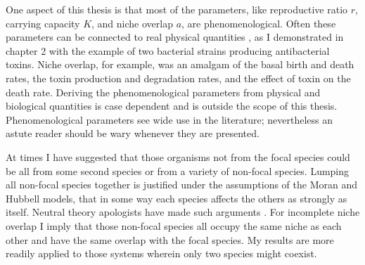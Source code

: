 One aspect of this thesis is that most of the parameters, like reproductive ratio $r$, carrying capacity $K$, and niche overlap $a$, are phenomenological. 
Often these parameters can be connected to real physical quantities \cite{Caperon1967,MacArthur1967}, as I demonstrated in chapter 2 with the example of two bacterial strains producing antibacterial toxins. 
Niche overlap, for example, was an amalgam of the basal birth and death rates, the toxin production and degradation rates, and the effect of toxin on the death rate. 
Deriving the phenomenological parameters from physical and biological quantities is case dependent and is outside the scope of this thesis. 
Phenomenological parameters see wide use in the literature; nevertheless an astute reader should be wary whenever they are presented. 

At times I have suggested that those organisms not from the focal species could be all from some second species or from a variety of non-focal species. 
Lumping all non-focal species together is justified under the assumptions of the Moran and Hubbell models, that in some way each species affects the others as strongly as itself. 
Neutral theory apologists have made such arguments \cite{Hubbell2006,Rosindell2011}. %
For incomplete niche overlap I imply that those non-focal species all occupy the same niche as each other and have the same overlap with the focal species. %
My results are more readily applied to those systems wherein only two species might coexist. 

